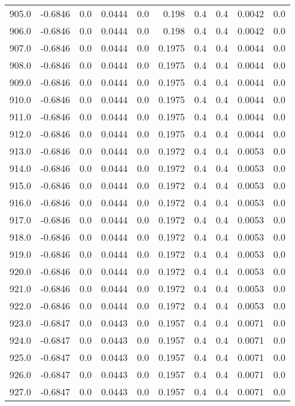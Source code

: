 \begin{longtable}{lrrrrrrrrr}
905.0 & -0.6846 & 0.0 & 0.0444 & 0.0 & 0.198 & 0.4 & 0.4 & 0.0042 & 0.0 \\
906.0 & -0.6846 & 0.0 & 0.0444 & 0.0 & 0.198 & 0.4 & 0.4 & 0.0042 & 0.0 \\
907.0 & -0.6846 & 0.0 & 0.0444 & 0.0 & 0.1975 & 0.4 & 0.4 & 0.0044 & 0.0 \\
908.0 & -0.6846 & 0.0 & 0.0444 & 0.0 & 0.1975 & 0.4 & 0.4 & 0.0044 & 0.0 \\
909.0 & -0.6846 & 0.0 & 0.0444 & 0.0 & 0.1975 & 0.4 & 0.4 & 0.0044 & 0.0 \\
910.0 & -0.6846 & 0.0 & 0.0444 & 0.0 & 0.1975 & 0.4 & 0.4 & 0.0044 & 0.0 \\
911.0 & -0.6846 & 0.0 & 0.0444 & 0.0 & 0.1975 & 0.4 & 0.4 & 0.0044 & 0.0 \\
912.0 & -0.6846 & 0.0 & 0.0444 & 0.0 & 0.1975 & 0.4 & 0.4 & 0.0044 & 0.0 \\
913.0 & -0.6846 & 0.0 & 0.0444 & 0.0 & 0.1972 & 0.4 & 0.4 & 0.0053 & 0.0 \\
914.0 & -0.6846 & 0.0 & 0.0444 & 0.0 & 0.1972 & 0.4 & 0.4 & 0.0053 & 0.0 \\
915.0 & -0.6846 & 0.0 & 0.0444 & 0.0 & 0.1972 & 0.4 & 0.4 & 0.0053 & 0.0 \\
916.0 & -0.6846 & 0.0 & 0.0444 & 0.0 & 0.1972 & 0.4 & 0.4 & 0.0053 & 0.0 \\
917.0 & -0.6846 & 0.0 & 0.0444 & 0.0 & 0.1972 & 0.4 & 0.4 & 0.0053 & 0.0 \\
918.0 & -0.6846 & 0.0 & 0.0444 & 0.0 & 0.1972 & 0.4 & 0.4 & 0.0053 & 0.0 \\
919.0 & -0.6846 & 0.0 & 0.0444 & 0.0 & 0.1972 & 0.4 & 0.4 & 0.0053 & 0.0 \\
920.0 & -0.6846 & 0.0 & 0.0444 & 0.0 & 0.1972 & 0.4 & 0.4 & 0.0053 & 0.0 \\
921.0 & -0.6846 & 0.0 & 0.0444 & 0.0 & 0.1972 & 0.4 & 0.4 & 0.0053 & 0.0 \\
922.0 & -0.6846 & 0.0 & 0.0444 & 0.0 & 0.1972 & 0.4 & 0.4 & 0.0053 & 0.0 \\
923.0 & -0.6847 & 0.0 & 0.0443 & 0.0 & 0.1957 & 0.4 & 0.4 & 0.0071 & 0.0 \\
924.0 & -0.6847 & 0.0 & 0.0443 & 0.0 & 0.1957 & 0.4 & 0.4 & 0.0071 & 0.0 \\
925.0 & -0.6847 & 0.0 & 0.0443 & 0.0 & 0.1957 & 0.4 & 0.4 & 0.0071 & 0.0 \\
926.0 & -0.6847 & 0.0 & 0.0443 & 0.0 & 0.1957 & 0.4 & 0.4 & 0.0071 & 0.0 \\
927.0 & -0.6847 & 0.0 & 0.0443 & 0.0 & 0.1957 & 0.4 & 0.4 & 0.0071 & 0.0 \\

\end{longtable}
